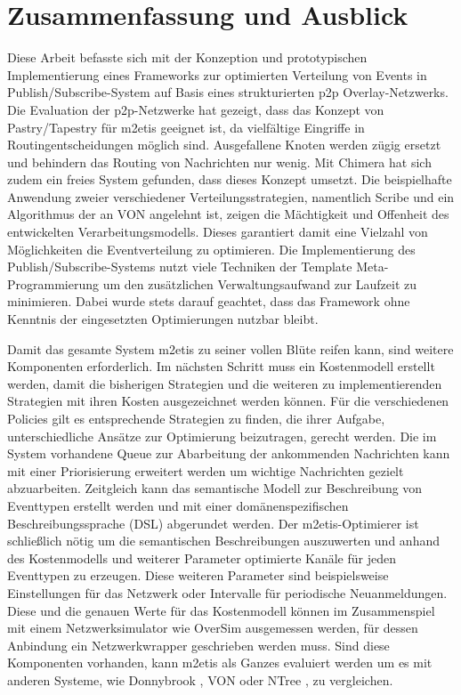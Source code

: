 \chapter{Zusammenfassung und Ausblick} 
\label{chap:zus}
Diese Arbeit befasste sich mit der Konzeption und prototypischen Implementierung eines Frameworks zur optimierten Verteilung von Events in Publish/Subscribe-System auf Basis eines strukturierten p2p Overlay-Netzwerks.\\
Die Evaluation der p2p-Netzwerke hat gezeigt, dass das Konzept von Pastry/Tapestry für \ac{m2etis} geeignet ist, da vielfältige Eingriffe in Routingentscheidungen möglich sind. Ausgefallene Knoten werden zügig ersetzt und behindern das Routing von Nachrichten nur wenig. Mit Chimera hat sich zudem ein freies System gefunden, dass dieses Konzept umsetzt. Die beispielhafte Anwendung zweier verschiedener Verteilungsstrategien, namentlich Scribe und ein Algorithmus der an VON angelehnt ist, zeigen die Mächtigkeit und Offenheit des entwickelten Verarbeitungsmodells. Dieses garantiert damit eine Vielzahl von Möglichkeiten die Eventverteilung zu optimieren. Die Implementierung des Publish/Subscribe-Systems nutzt viele Techniken der Template Meta-Programmierung um den zusätzlichen Verwaltungsaufwand zur Laufzeit zu minimieren. Dabei wurde stets darauf geachtet, dass das Framework ohne Kenntnis der eingesetzten Optimierungen nutzbar bleibt.

Damit das gesamte System \ac{m2etis} zu seiner vollen Blüte reifen kann, sind weitere Komponenten erforderlich. Im nächsten Schritt muss ein Kostenmodell erstellt werden, damit die bisherigen Strategien und die weiteren zu implementierenden Strategien mit ihren Kosten ausgezeichnet werden können. Für die verschiedenen Policies gilt es entsprechende Strategien zu finden, die ihrer Aufgabe, unterschiedliche Ansätze zur Optimierung beizutragen, gerecht werden. Die im System vorhandene Queue zur Abarbeitung der ankommenden Nachrichten kann mit einer Priorisierung erweitert werden um wichtige Nachrichten gezielt abzuarbeiten. Zeitgleich kann das semantische Modell zur Beschreibung von Eventtypen erstellt werden und mit einer domänenspezifischen Beschreibungssprache (DSL) abgerundet werden. Der \ac{m2etis}-Optimierer ist schließlich nötig um die semantischen Beschreibungen auszuwerten und anhand des Kostenmodells und weiterer Parameter optimierte Kanäle für jeden Eventtypen zu erzeugen. Diese weiteren Parameter sind beispielsweise Einstellungen für das Netzwerk oder Intervalle für periodische Neuanmeldungen. Diese und die genauen Werte für das Kostenmodell können im Zusammenspiel mit einem Netzwerksimulator wie OverSim \cite{Baumgart2007OverSim} ausgemessen werden, für dessen Anbindung ein Netzwerkwrapper geschrieben werden muss. Sind diese Komponenten vorhanden, kann \ac{m2etis} als Ganzes evaluiert werden um es mit anderen Systeme, wie Donnybrook \cite{Bharambe2008Donnybrook}, VON \cite{Hu2006VON} oder NTree \cite{GauthierDickey2005Using}, zu vergleichen.
